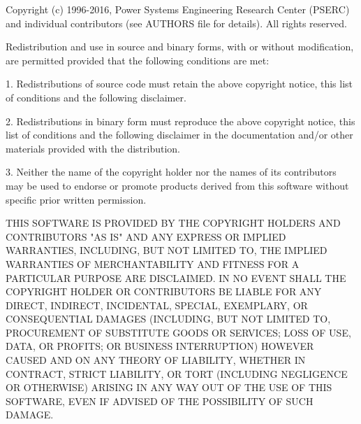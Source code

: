 \begin{Notice}
Copyright (c) 1996-2016, Power Systems Engineering Research Center
(PSERC) and individual contributors (see AUTHORS file for details).
All rights reserved.

Redistribution and use in source and binary forms, with or without
modification, are permitted provided that the following conditions
are met:

1. Redistributions of source code must retain the above copyright
notice, this list of conditions and the following disclaimer.

2. Redistributions in binary form must reproduce the above copyright
notice, this list of conditions and the following disclaimer in the
documentation and/or other materials provided with the distribution.

3. Neither the name of the copyright holder nor the names of its
contributors may be used to endorse or promote products derived from
this software without specific prior written permission.

THIS SOFTWARE IS PROVIDED BY THE COPYRIGHT HOLDERS AND CONTRIBUTORS
"AS IS" AND ANY EXPRESS OR IMPLIED WARRANTIES, INCLUDING, BUT NOT
LIMITED TO, THE IMPLIED WARRANTIES OF MERCHANTABILITY AND FITNESS
FOR A PARTICULAR PURPOSE ARE DISCLAIMED. IN NO EVENT SHALL THE
COPYRIGHT HOLDER OR CONTRIBUTORS BE LIABLE FOR ANY DIRECT, INDIRECT,
INCIDENTAL, SPECIAL, EXEMPLARY, OR CONSEQUENTIAL DAMAGES (INCLUDING,
BUT NOT LIMITED TO, PROCUREMENT OF SUBSTITUTE GOODS OR SERVICES;
LOSS OF USE, DATA, OR PROFITS; OR BUSINESS INTERRUPTION) HOWEVER
CAUSED AND ON ANY THEORY OF LIABILITY, WHETHER IN CONTRACT, STRICT
LIABILITY, OR TORT (INCLUDING NEGLIGENCE OR OTHERWISE) ARISING IN
ANY WAY OUT OF THE USE OF THIS SOFTWARE, EVEN IF ADVISED OF THE
POSSIBILITY OF SUCH DAMAGE.
\end{Notice}